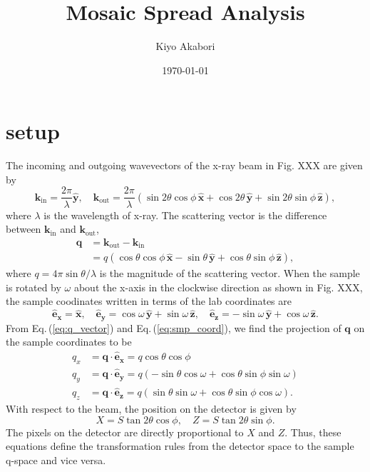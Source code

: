 \documentclass[12pt,letterpaper]{article}
\author{Kiyo Akabori}
\title{Mosaic Spread Analysis}
\date{\today}
\newcommand{\Eq}[1]{Eq.\,(\ref{#1})} %
\newcommand{\xhat}{\mathbf{\hat{x}}}
\newcommand{\yhat}{\mathbf{\hat{y}}}
\newcommand{\zhat}{\mathbf{\hat{z}}}
\newcommand{\kin}{\mathbf{k}_{\mathrm{in}}}
\newcommand{\kout}{\mathbf{k}_{\mathrm{out}}}
\begin{document}

\section{setup}
The incoming and outgoing wavevectors of the x-ray beam in Fig. XXX 
are given by
\begin{equation}
  \kin = \frac{2\pi}{\lambda} \yhat, \quad
  \kout = 
    \frac{2\pi}{\lambda} \left( 
      \sin 2\theta \cos\phi \, \xhat
      + \cos 2\theta \, \yhat
      + \sin 2\theta \sin\phi \, \zhat 
    \right),
  \label{eq:kinkout}
\end{equation}
where $\lambda$ is the wavelength of x-ray. The scattering vector is
the difference between $\kin$ and $\kout$,
\begin{align}
  \mathbf{q} &= \kout - \kin \nonumber \\
             &= q \left( 
                  \cos\theta\cos\phi \, \xhat - \sin\theta \, \yhat
                  + \cos\theta\sin\phi \, \zhat
                \right),
  \label{eq:q_vector}
\end{align}
where $q=4\pi\sin\theta/\lambda$ is the magnitude of the scattering vector. 
When the sample is rotated by $\omega$ about the x-axis in the clockwise 
direction as shown in Fig. XXX, the sample coodinates written in terms of 
the lab coordinates are  
\begin{equation}
  \mathbf{\hat{e}_x} = \xhat, \quad
  \mathbf{\hat{e}_y} = \cos\omega\,\yhat + \sin\omega\,\zhat, \quad
  \mathbf{\hat{e}_z} = -\sin\omega\,\yhat + \cos\omega\,\zhat.
  \label{eq:smp_coord}
\end{equation}
From \Eq{eq:q_vector} and \Eq{eq:smp_coord}, we find the projection of 
$\mathbf{q}$ on the sample coordinates to be
\begin{align}
  q_x &= \mathbf{q}\cdot\mathbf{\hat{e}_x} 
       = q\cos\theta\cos\phi 
       \label{eq:qx} \\
  q_y &= \mathbf{q}\cdot\mathbf{\hat{e}_y} 
       = q\left(-\sin\theta\cos\omega + \cos\theta\sin\phi\sin\omega\right) 
       \label{eq:qy} \\
  q_z &= \mathbf{q}\cdot\mathbf{\hat{e}_z} 
       = q\left(\sin\theta\sin\omega + \cos\theta\sin\phi\cos\omega\right).
       \label{eq:qz}
\end{align}
With respect to the beam, the position on the detector is given by
\begin{equation}
  X = S \tan 2\theta \cos\phi, \quad Z = S \tan 2\theta \sin\phi.
\end{equation} 
The pixels on the detector are directly proportional to $X$ and $Z$. Thus,
these equations define the transformation rules from the detector space
to the sample q-space and vice versa.
\end{document}
